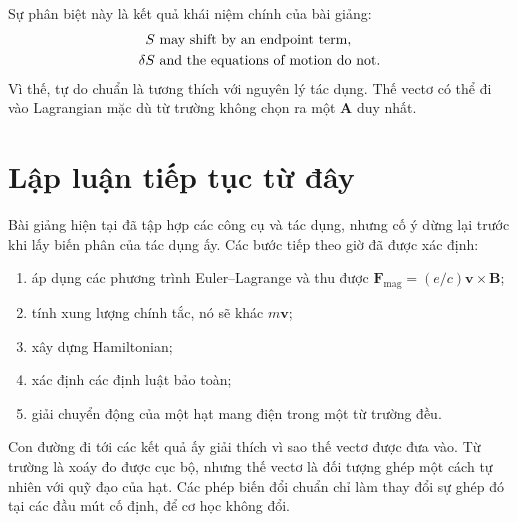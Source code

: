 Sự phân biệt này là kết quả khái niệm chính của bài giảng:
\begin{equation}
  \begin{aligned}
    S&\ \hbox{may shift by an endpoint term},\\
    \delta S&\ \hbox{and the equations of motion do not}.
  \end{aligned}
\end{equation}
Vì thế, tự do chuẩn là tương thích với nguyên lý tác dụng. Thế vectơ có thể đi vào Lagrangian mặc dù từ trường không chọn ra một \(\mathbf A\) duy nhất.

\section{Lập luận tiếp tục từ đây}

Bài giảng hiện tại đã tập hợp các công cụ và tác dụng, nhưng cố ý dừng lại trước khi lấy biến phân của tác dụng ấy. Các bước tiếp theo giờ đã được xác định:
\begin{enumerate}
  \item áp dụng các phương trình Euler--Lagrange và thu được
  \(\mathbf F_{\mathrm{mag}}=(e/c)\mathbf v\times\mathbf B\);
  \item tính xung lượng chính tắc, nó sẽ khác \(m\mathbf v\);
  \item xây dựng Hamiltonian;
  \item xác định các định luật bảo toàn;
  \item giải chuyển động của một hạt mang điện trong một từ trường đều.
\end{enumerate}

Con đường đi tới các kết quả ấy giải thích vì sao thế vectơ được đưa vào. Từ trường là xoáy đo được cục bộ, nhưng thế vectơ là đối tượng ghép một cách tự nhiên với quỹ đạo của hạt. Các phép biến đổi chuẩn chỉ làm thay đổi sự ghép đó tại các đầu mút cố định, để cơ học không đổi.